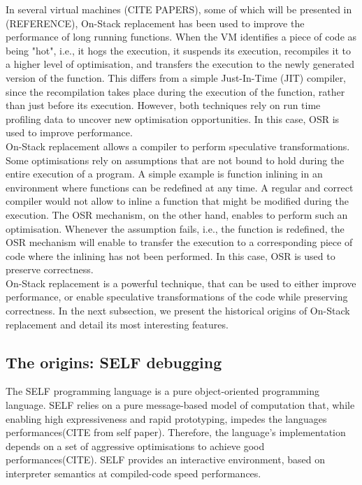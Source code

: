In several virtual machines (CITE PAPERS), some of which will be presented in (REFERENCE), On-Stack replacement has been used to improve the performance of long running functions.
When the VM identifies a piece of code as being "hot", i.e., it hogs the execution, it suspends its execution, recompiles it to a higher level of optimisation, and transfers the execution to the newly generated version of the function.
This differs from a simple Just-In-Time (JIT) compiler, since the recompilation takes place during the execution of the function, rather than just before its execution.
However, both techniques rely on run time profiling data to uncover new optimisation opportunities.
In this case, OSR is used to improve performance.\\

On-Stack replacement allows a compiler to perform speculative transformations.
Some optimisations rely on assumptions that are not bound to hold during the entire execution of a program.
A simple example is function inlining in an environment where functions can be redefined at any time.
A regular and correct compiler would not allow to inline a function that might be modified during the execution.
The OSR mechanism, on the other hand, enables to perform such an optimisation.
Whenever the assumption fails, i.e., the function is redefined, the OSR mechanism will enable to transfer the execution to a corresponding piece of code where the inlining has not been performed.
In this case, OSR is used to preserve correctness.\\

On-Stack replacement is a powerful technique, that can be used to either improve performance, or enable speculative transformations of the code while preserving correctness.
In the next subsection, we present the historical origins of On-Stack replacement and detail its most interesting features.\\ %
  

\subsection{The origins: SELF debugging}
The SELF programming language is a pure object-oriented programming language.
SELF relies on a pure message-based model of computation that, while enabling high expressiveness and rapid prototyping, impedes the languages performances(CITE from self paper).
Therefore, the language's implementation depends on a set of aggressive optimisations to achieve good performances(CITE).
SELF provides an interactive environment, based on interpreter semantics at compiled-code speed performances.\\

